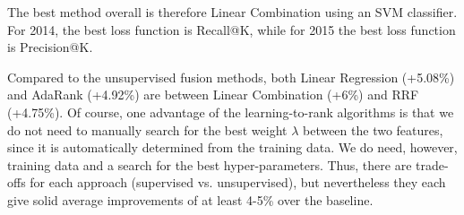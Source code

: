 \begin{table}
\centering
\caption{Comparison between the best fusion methods --- absolute P@10 percent improvements for each of the four query runs
(Summaries 2014, Descriptions 2014, Summaries 2015, Descriptions 2015).}
\label{fusion-comp}
\end{table}

The best method overall is therefore Linear Combination using an SVM classifier. For 2014, the best loss function
is Recall@K, while for 2015 the best loss function is Precision@K.

Compared to the unsupervised fusion methods, both Linear Regression (+5.08\%) and AdaRank (+4.92\%) are between
Linear Combination (+6\%) and RRF (+4.75\%). Of course, one advantage of the learning-to-rank algorithms
is that we do not need to manually search for the best weight $\lambda$ between the two features,
since it is automatically determined
from the training data.
We do need, however, training data and a search for the best hyper-parameters.
Thus, there are trade-offs for each approach (supervised vs. unsupervised),
but nevertheless they each give solid average improvements of at least 4-5\% over the baseline.

